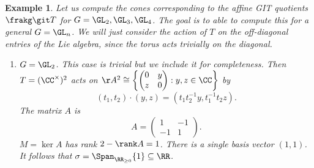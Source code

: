 \documentclass[12pt]{amsart}
\theoremstyle{plain}
\newtheorem{example}[theorem]{Example}
\begin{document}
\begin{example}
Let us compute the cones corresponding to the affine GIT quotients $\frakg \git T$ for $G = \GL_2, \GL_3, \GL_4$.
The goal is to able to compute this for a general $G = \GL_n$.
We will just consider the action of $T$ on the off-diagonal entries of the Lie algebra, since the torus acts trivially on the diagonal.
\begin{enumerate}
\item
$G = \GL_2$.
This case is trivial but we include it for completeness.
Then $T = (\CC^\times)^2$ acts on $\AA^2 \cong \left\{\begin{pmatrix} 0 & y \\ z & 0 \end{pmatrix} : y, z \in \CC\right\}$ by
$$(t_1, t_2) \cdot (y, z) = (t_1 t_2^{-1} y, t_1^{-1} t_2 z).$$
The matrix $A$ is
$$A = \begin{pmatrix} 1 & -1 \\ -1 & 1 \end{pmatrix}.$$
$M = \ker A$ has rank $2 - \rank A = 1$.
There is a single basis vector $(1, 1)$.
It follows that $\sigma = \Span_{\RR_{\ge 0}} \{ 1 \} \subseteq \RR$.


\end{enumerate}
\end{example}
\end{document}
